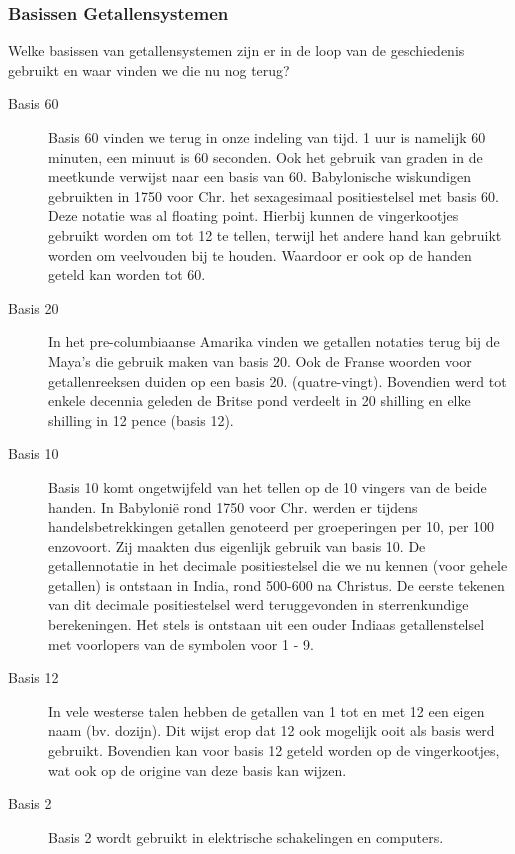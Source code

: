 \documentclass[../main.tex]{subfiles}
\begin{document}
\subsubsection{Basissen Getallensystemen}
\begin{question}
Welke basissen van getallensystemen zijn er in de loop van de geschiedenis gebruikt en waar vinden we die nu nog terug?
\end{question}

\begin{solution}
\begin{description}
		\item[Basis 60] Basis 60 vinden we terug in onze indeling van tijd. 1 uur is namelijk 60 minuten, een minuut is 60 seconden. Ook het gebruik van graden in de meetkunde verwijst naar een basis van 60. Babylonische wiskundigen gebruikten in 1750 voor Chr. het sexagesimaal positiestelsel met basis 60. Deze notatie was al floating point. Hierbij kunnen de vingerkootjes gebruikt worden om tot 12 te tellen, terwijl het andere hand kan gebruikt worden om veelvouden bij te houden. Waardoor er ook op de handen geteld kan worden tot 60.
		\item[Basis 20] In het pre-columbiaanse Amarika vinden we getallen notaties terug bij de Maya's die gebruik maken van basis 20. Ook de Franse woorden voor getallenreeksen duiden op een basis 20.
		(quatre-vingt). Bovendien werd tot enkele decennia geleden de Britse pond verdeelt in 20 shilling en elke shilling in 12 pence (basis 12).
		\item[Basis 10] Basis 10 komt ongetwijfeld van het tellen op de 10 vingers van de beide handen. In Babyloni\"e rond 1750 voor Chr. werden er tijdens handelsbetrekkingen getallen genoteerd per groeperingen per 10, per 100 enzovoort. Zij maakten dus eigenlijk gebruik van basis 10. De getallennotatie in het decimale positiestelsel die we nu kennen (voor gehele getallen) is ontstaan in India, rond 500-600 na Christus. De eerste tekenen van dit decimale positiestelsel werd teruggevonden in sterrenkundige berekeningen. Het stels is ontstaan uit een ouder Indiaas getallenstelsel met voorlopers van de symbolen voor 1 - 9.
		\item[Basis 12] In vele westerse talen hebben de getallen van 1 tot en met 12 een eigen naam (bv. dozijn). Dit wijst erop dat 12 ook mogelijk ooit als basis werd gebruikt. Bovendien kan voor basis 12 geteld worden op de vingerkootjes, wat ook op de origine van deze basis kan wijzen.
		\item[Basis 2] Basis 2 wordt gebruikt in elektrische schakelingen en computers.
\end{description}
\end{solution}
\end{document}
